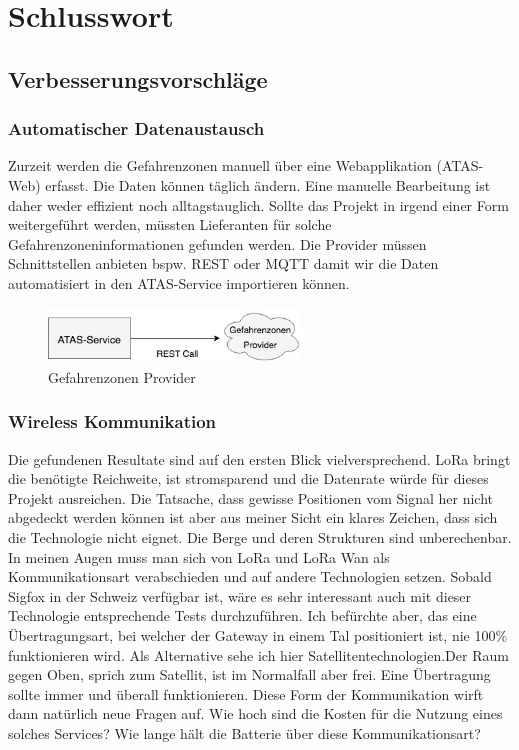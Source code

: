 \documentclass[11pt,english,german]{report}
\theoremstyle{definition}
\begin{document}
\chapter{Schlusswort}
\section{Verbesserungsvorschläge}
\subsection{Automatischer Datenaustausch}
Zurzeit werden die Gefahrenzonen manuell über eine Webapplikation (ATAS-Web) erfasst. Die Daten können täglich ändern. Eine manuelle Bearbeitung ist daher weder effizient noch alltagstauglich. Sollte das Projekt in irgend einer Form weitergeführt werden, müssten Lieferanten für solche Gefahrenzoneninformationen gefunden werden. Die  Provider müssen Schnittstellen anbieten bspw. REST oder MQTT damit wir die Daten automatisiert in den ATAS-Service importieren können. 

\begin{figure}[H]
	\centering
	\includegraphics[width=0.6\textwidth]{img/system/ATAS_ExternalAccess.jpg}
	\caption[Gefahrenzonen Provider]
	{Gefahrenzonen Provider}
\end{figure}

\subsection{Wireless Kommunikation}
Die gefundenen Resultate sind auf den ersten Blick vielversprechend. LoRa bringt die benötigte Reichweite, ist stromsparend und die Datenrate würde für dieses Projekt ausreichen. Die Tatsache, dass gewisse Positionen vom Signal her nicht abgedeckt werden können ist aber aus meiner Sicht ein klares Zeichen, dass sich die Technologie nicht eignet. Die Berge und deren Strukturen sind unberechenbar.
\\[0.3cm]
In meinen Augen muss man sich von LoRa und LoRa Wan als Kommunikationsart verabschieden und auf andere Technologien setzen. Sobald Sigfox in der Schweiz verfügbar ist, wäre es sehr interessant auch mit dieser Technologie entsprechende Tests durchzuführen. Ich befürchte aber, das eine Übertragungsart, bei welcher der Gateway in einem Tal positioniert ist, nie 100\% funktionieren wird. Als Alternative sehe ich hier Satellitentechnologien.Der Raum gegen Oben, sprich zum Satellit, ist im Normalfall aber frei. Eine Übertragung sollte immer und überall funktionieren. Diese Form der Kommunikation wirft dann natürlich neue Fragen auf. Wie hoch sind die Kosten für die Nutzung eines solches Services? Wie lange hält die Batterie über diese Kommunikationsart?
\end{document}
